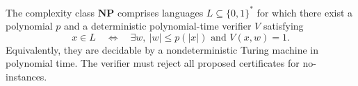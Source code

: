
The complexity class $\mathbf{NP}$ comprises languages $L\subseteq\{0,1\}^*$ for which there exist a polynomial $p$ and a deterministic polynomial-time verifier $V$ satisfying
\[
x\in L\quad\Longleftrightarrow\quad
\exists w,\ |w|\le p(|x|)\text{ and }V(x,w)=1.
\]
Equivalently, they are decidable by a nondeterministic Turing machine in polynomial time. The verifier must reject all proposed certificates for no-instances.

